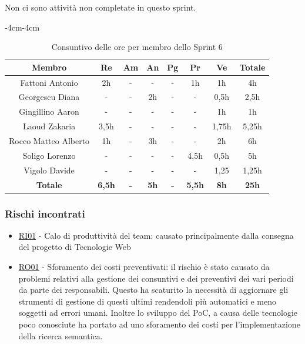 \documentclass[a4paper,12pt]{article}
\begin{document}
Non ci sono attività non completate in questo sprint.

\begin{table}[H]
    \begin{adjustwidth}{-4cm}{-4cm}
    \centering
    \begin{tabular}{|c|c|c|c|c|c|c|c|}
        \hline
        \textbf{Membro}& \textbf{Re} & \textbf{Am} & \textbf{An} & \textbf{Pg} & \textbf{Pr} & \textbf{Ve} & \textbf{Totale} \\
        \hline
        Fattoni Antonio & 2h & - & - & - & 1h & 1h & 4h \\
        \hline
        Georgescu Diana & - & - & 2h & - & - & 0,5h & 2,5h \\
        \hline
        Gingillino Aaron & - & - & - & - & - & 1h & 1h \\
        \hline
        Laoud Zakaria & 3,5h & - & - & - & - & 1,75h & 5,25h \\
        \hline
        Rocco Matteo Alberto & 1h & - & 3h & - & - & 2h & 6h \\
        \hline
        Soligo Lorenzo & - & - & - & - & 4,5h & 0,5h & 5h \\
        \hline
        Vigolo Davide & - & - & - & - & - & 1,25 & 1,25h \\
        \hline
        \textbf{Totale} & \textbf{6,5h} & \textbf{-} & \textbf{5h} & \textbf{-} & \textbf{5,5h} & \textbf{8h} & \textbf{25h} \\
        \hline
    \end{tabular}
    \caption{Consuntivo delle ore per membro dello Sprint 6}
    \end{adjustwidth}
\end{table}

\subsubsection{Rischi incontrati}
\begin{itemize}
    \item \hyperref[RI01]{RI01} - Calo di produttività del team: causato principalmente dalla consegna del progetto di Tecnologie Web
    \item \hyperref[RO01]{RO01} - Sforamento dei costi preventivati: il rischio è stato causato da problemi relativi alla gestione dei consuntivi e dei preventivi dei vari periodi da parte dei responsabili. Questo ha scaturito la necessità di aggiornare gli strumenti di gestione di questi ultimi rendendoli più automatici e meno soggetti ad errori umani. Inoltre lo sviluppo del PoC, a causa delle tecnologie poco conosciute ha portato ad uno sforamento dei costi per l'implementazione della ricerca semantica.
\end{itemize}
\end{document}
